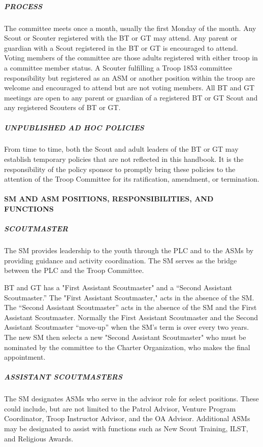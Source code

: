 \documentclass{ltxguide}
\begin{document}
\subparagraph{PROCESS}
The committee meets once a month, usually the first Monday of the month. Any Scout or Scouter registered with the \ac{BT} or \ac{GT} may attend. Any parent or guardian with a Scout registered in the \ac{BT} or \ac{GT} is encouraged to attend. Voting members of the committee are those adults registered with either troop in a committee member status. A Scouter fulfilling a Troop 1853 committee responsibility but registered as an \ac{ASM} or another position within the troop are welcome and encouraged to attend but are not voting members. All \ac{BT} and \ac{GT} meetings are open to any parent or guardian of a registered \ac{BT} or \ac{GT} Scout and any registered Scouters of \ac{BT} or \ac{GT}.

\subparagraph{UNPUBLISHED AD HOC POLICIES}
From time to time, both the Scout and adult leaders of the \ac{BT} or \ac{GT} may establish temporary policies that are not reflected in this handbook. It is the responsibility of the policy sponsor to promptly bring these policies to the attention of the Troop Committee for its  ratification, amendment, or termination.

\paragraph{\ac{SM} AND \ac{ASM} POSITIONS, RESPONSIBILITIES, AND FUNCTIONS}
\subparagraph{SCOUTMASTER}
The \ac{SM} provides leadership to the youth through the \ac{PLC} and to the \acp{ASM} by providing guidance and activity coordination. The \ac{SM} serves as the bridge between the \ac{PLC} and the Troop Committee.

\ac{BT} and \ac{GT} has a "First Assistant Scoutmaster" and a “Second Assistant Scoutmaster.” The "First Assistant Scoutmaster," acts in the absence of the \ac{SM}. The “Second Assistant Scoutmaster” acts in the absence of the \ac{SM} and the First Assistant Scoutmaster. Normally the First Assistant Scoutmaster and the Second Assistant Scoutmaster “move-up” when the \ac{SM}'s term is over every two years. The new \ac{SM} then selects a new "Second Assistant Scoutmaster" who must be nominated by the committee to the Charter Organization, who makes the final appointment.

\subparagraph{ASSISTANT SCOUTMASTERS}
The \ac{SM} designates \acp{ASM} who serve in the advisor role for select positions. These could include, but are not limited to the Patrol Advisor, Venture Program Coordinator, Troop Instructor Advisor, and the \ac{OA} Advisor. Additional \acp{ASM} may be designated to assist with functions such as New Scout Training, \ac{ILST}, and Religious Awards.
\end{document}
